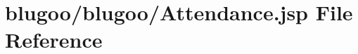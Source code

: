 \hypertarget{Attendance_8jsp}{
\section{blugoo/blugoo/Attendance.jsp File Reference}
\label{Attendance_8jsp}
}


